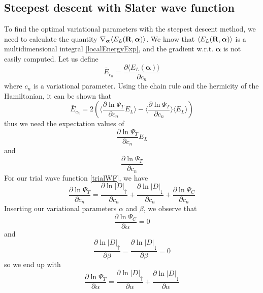 \documentclass[english, a4paper]{article}
\begin{document}
\subsection{Steepest descent with Slater wave function} \label{sec:slaterOptimization}
To find the optimal variational parameters with the steepest descent method, we need to calculate the 
quantity $\nabla_{\boldsymbol{\alpha}} \langle E_L({\bf R}, \boldsymbol{\alpha}) \rangle$. 
We know that
$\langle E_L({\bf R}, \boldsymbol{\alpha}) \rangle$ is 
a multidimensional integral 
\eqref{localEnergyExp}, 
and the gradient w.r.t. $\boldsymbol{\alpha}$
is not easily computed.
Let us define
\begin{equation}
 \bar{E}_{c_n} = \frac{\partial \langle E_L(\boldsymbol{\alpha}) \rangle}{\partial c_n}
\end{equation}
where $c_n$ is a variational parameter.
Using the chain rule and the hermicity of the Hamiltonian,
it can be shown that
\begin{equation}
 \bar{E}_{c_n} = 2 \left( \Bigr\langle \frac{\partial \ln{\Psi_T}}{\partial c_n} E_L 
 \Bigr\rangle 
 - \Bigr\langle \frac{\partial \ln{\Psi_T}}{\partial c_n}\Bigr\rangle \langle E_L \rangle   \right)
 \label{localEnergyParameters}
\end{equation}
thus we need the expectation values of
\begin{equation}
 \frac{\partial \ln{\Psi_T}}{\partial c_n} E_L
 \label{sampleOptimize1}
\end{equation}
and 
\begin{equation}
\frac{\partial \ln{\Psi_T}}{\partial c_n}
\label{sampleOptimize2}
\end{equation}
For our trial wave function \eqref{trialWF}, we have
\begin{equation}
 \frac{\partial\ln{\Psi_T}}{\partial c_n} = \frac{\partial\ln{|D|_\uparrow}}{\partial c_n} + 
 \frac{\partial\ln{|D|_\downarrow}}{\partial c_n} + \frac{\partial\ln{\Psi_C}}{\partial c_n}
\end{equation}
Inserting our variational parameters $\alpha$ and $\beta$, we observe that
\begin{equation}
 \frac{\partial\ln{\Psi_C}}{\partial \alpha} = 0
\end{equation}
and 
\begin{equation}
 \frac{\partial\ln{|D|_\uparrow}}{\partial \beta} = \frac{\partial\ln{|D|_\downarrow}}{\partial \beta} = 0
\end{equation}
so we end up with
\begin{equation}
 \frac{\partial\ln{\Psi_T}}{\partial \alpha} = \frac{\partial\ln{|D|_\uparrow}}{\partial \alpha} + 
 \frac{\partial\ln{|D|_\downarrow}}{\partial \alpha}
\end{equation}
\end{document}
